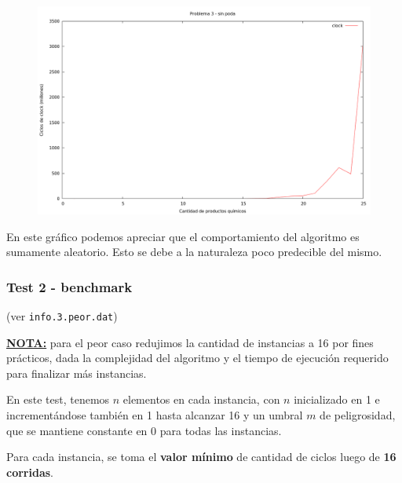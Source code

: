 \vspace*{0.5cm}

\begin{figure}[h]
  \begin{center}
    \includegraphics[scale=0.35]{imagenes/grafico-3-pelado.png}
  \end{center}
\end{figure}

\vspace*{0.5cm}

En este gráfico podemos apreciar que el comportamiento del algoritmo es
sumamente aleatorio. Esto se debe a la naturaleza poco predecible del mismo.


\newpage
\subsubsection{Test 2 - benchmark }

(ver \verb|info.3.peor.dat|) \medskip

\underline{\textbf{NOTA:}} para el peor caso redujimos la cantidad de instancias a 16 por fines prácticos, dada la complejidad
del algoritmo y el tiempo de ejecución requerido para finalizar más instancias. \medskip

En este test, tenemos $n$ elementos en cada instancia, con $n$ inicializado en 1 e incrementándose
también en 1 hasta alcanzar 16 y un umbral $m$ de peligrosidad, que se mantiene constante en 0 para todas las
instancias.

Para cada instancia, se toma el \textbf{valor mínimo} de cantidad de ciclos luego de \textbf{16 corridas}.

\vspace*{0.5cm}


